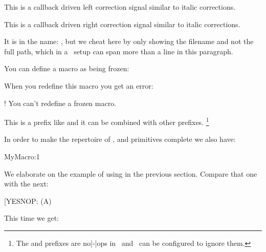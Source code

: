 This is a callback driven left correction signal similar to italic corrections.

\stopnewprimitive

\startnewprimitive[title={\prm {forcedrightcorrection}}]

This is a callback driven right correction signal similar to italic corrections.

\stopnewprimitive

\startnewprimitive[title={\prm {formatname}}]

It is in the name: {\tttf \filenameonly {\formatname}}, but we cheat here by only
showing the filename and not the full path, which in a \CONTEXT\ setup can span
more than a line in this paragraph.

\stopnewprimitive

\startnewprimitive[title={\prm {frozen}}]

You can define a macro as being frozen:

\starttyping
\frozen{}
\stoptyping

When you redefine this macro you get an error:

\starttyping
! You can't redefine a frozen macro.
\stoptyping

This is a prefix like  and it can be combined with other prefixes.
\footnote {The  and  prefixes are no|-|ops in
\LUAMETATEX\ and \LUATEX\ can be configured to ignore them.}

\stopnewprimitive

\startnewprimitive[title={\prm {futurecsname}}]

In order to make the repertoire of ,  and 
primitives complete we also have:

\starttyping
\futurecsname MyMacro:1\endcsname\MyAction
\stoptyping

\stopnewprimitive

\startnewprimitive[title={\prm {futuredef}}]

We elaborate on the example of using  in the previous section.
Compare that one with the next:

\startbuffer
\def\MySpecialToken{[}
\def\DoWhatever{\ifx\NextToken\MySpecialToken YES\else NOP\fi : }
\futurelet\NextToken\DoWhatever [A]\crlf
\futurelet\NextToken\DoWhatever (A)\par
\stopbuffer

\typebuffer

This time we get:

